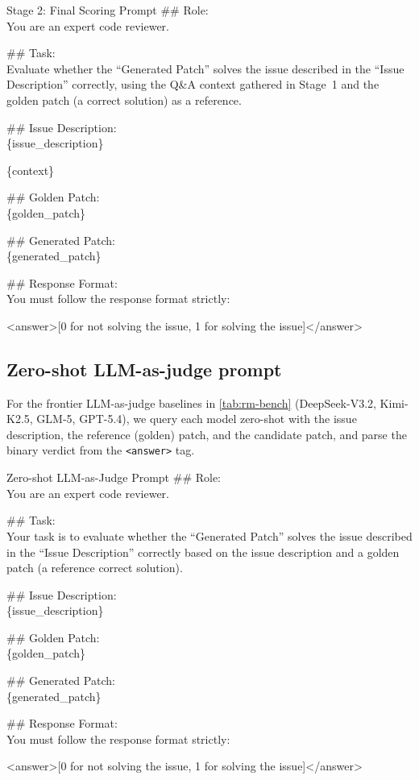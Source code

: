 \documentclass{llmxive}
\begin{document}
\begin{promptbox}{Stage 2: Final Scoring Prompt}
  \#\# Role:\\
  You are an expert code reviewer.

  \#\# Task:\\
  Evaluate whether the ``Generated Patch'' solves the issue described in the ``Issue Description'' correctly, using the Q\&A context gathered in Stage~1 and the golden patch (a correct solution) as a reference.

  \#\# Issue Description:\\
  \{issue\_description\}

  \{context\}

  \#\# Golden Patch:\\
  \{golden\_patch\}

  \#\# Generated Patch:\\
  \{generated\_patch\}

  \#\# Response Format:\\
  You must follow the response format strictly:

  \textless answer\textgreater[0 for not solving the issue, 1 for solving the issue]\textless /answer\textgreater
\end{promptbox}

\subsection{Zero-shot LLM-as-judge prompt}
\label{app:prompt-judge}

For the frontier LLM-as-judge baselines in \cref{tab:rm-bench} (DeepSeek-V3.2, Kimi-K2.5, GLM-5, GPT-5.4), we query each model zero-shot with the issue description, the reference (golden) patch, and the candidate patch, and parse the binary verdict from the \texttt{<answer>} tag.

\begin{promptbox}{Zero-shot LLM-as-Judge Prompt}
  \#\# Role:\\
  You are an expert code reviewer.

  \#\# Task:\\
  Your task is to evaluate whether the ``Generated Patch'' solves the issue described in the ``Issue Description'' correctly based on the issue description and a golden patch (a reference correct solution).

  \#\# Issue Description:\\
  \{issue\_description\}

  \#\# Golden Patch:\\
  \{golden\_patch\}

  \#\# Generated Patch:\\
  \{generated\_patch\}

  \#\# Response Format:\\
  You must follow the response format strictly:

  \textless answer\textgreater[0 for not solving the issue, 1 for solving the issue]\textless /answer\textgreater
\end{promptbox}
\end{document}

